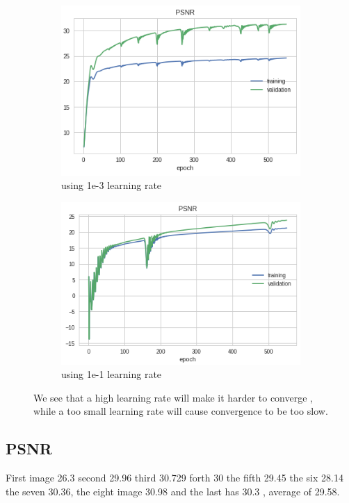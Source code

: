 \documentclass[12pt]{article}
\begin{document}
\begin{figure}[h!]
  \centering
  \begin{subfigure}[b]{0.4\linewidth}
    \includegraphics[width=\linewidth]{psnradam1d.png}
    \caption{using 1e-3 learning rate}
  \end{subfigure}
  \begin{subfigure}[b]{0.4\linewidth}
    \includegraphics[width=\linewidth]{LR1e-1in1d.png}
    \caption{using 1e-1 learning rate}
  \end{subfigure}
  \caption{We see that a high learning rate will make it harder to converge , while a too small learning rate will cause convergence to be too slow.}
  \label{fig:learning_rate_1d}
\end{figure}

\subsection{PSNR}
First image 26.3 second 29.96 third 30.729 forth 30 the fifth 29.45 the six 28.14 the seven 30.36, the eight image 30.98 and the last has 30.3 ,  average of 29.58.
\end{document}

